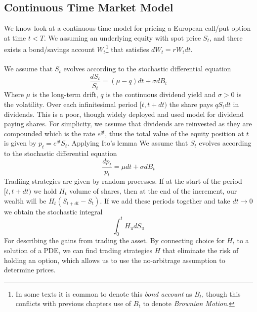 \documentclass{article}
\begin{document}
\subsection{Continuous Time Market Model}
We know look at a continuous time model for pricing a European call/put option at time $t<T$. We assuming an underlying equity with spot price $S_t$, and there exists a bond/savings account $W_t$\footnote{In some texts it is common to denote this \textit{bond account} as $B_t$, though this conflicts with previous chapters use of $B_t$ to denote \textit{Brownian Motion}.} that satisfies $dW_t = rW_tdt$. \\
\\
We assume that $S_t$ evolves according to the stochastic differential equation
$$\frac{dS_t}{S_t} = (\mu - q)dt + \sigma dB_t$$
Where $\mu$ is the long-term drift, $q$ is the continuous dividend yield and $\sigma>0$
is the volatility. Over each infinitesimal period $[t, t+dt)$ the share pays $qS_tdt$ in dividends. This is a poor, though widely deployed and used model for dividend paying shares. For simplicity, we assume that dividends are reinvested as they are compounded which is the rate $e^{qt}$, thus the total value of the equity position at $t$ is given by $p_t = e^{qt}S_t$. Applying Ito's lemma
We assume that $S_t$ evolves according to the stochastic differential equation
$$\frac{dp_t}{p_t} =  \mu dt + \sigma dB_t$$
Tradiing strategies are given by random processes. If at the start of the period $[t, t+dt)$ we hold $H_t$ volume of shares, then at the end of the increment, our wealth will be $H_t(S_{t+dt} - S_t)$. If we add these periods together and take $dt\longrightarrow0$ we obtain the stochastic integral 
$$\int_{0}^{t}H_u dS_u$$
For describing the gains from trading the asset. By connecting choice for $H_t$ to a solution of a PDE, we can find trading strategies $H$ that eliminate the risk of holding an option, which allows us to use the no-arbitrage assumption to determine prices. 
\end{document}
